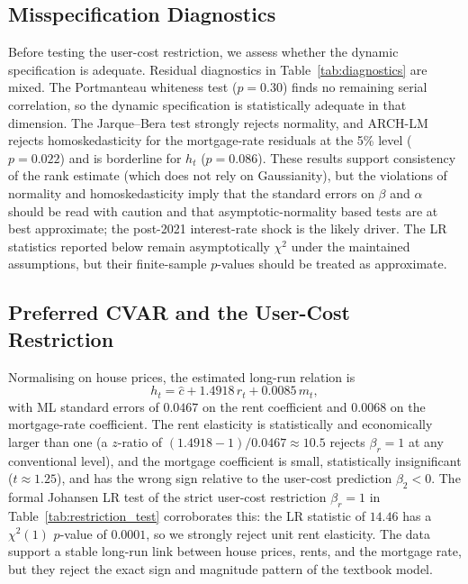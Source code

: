 \documentclass[12pt]{article}
\begin{document}
\subsection{Misspecification Diagnostics}

Before testing the user-cost restriction, we assess whether the dynamic specification is adequate. Residual diagnostics in Table~\ref{tab:diagnostics} are mixed. The Portmanteau whiteness test ($p=0.30$) finds no remaining serial correlation, so the dynamic specification is statistically adequate in that dimension. The Jarque--Bera test strongly rejects normality, and ARCH-LM rejects homoskedasticity for the mortgage-rate residuals at the 5\% level ($p=0.022$) and is borderline for $h_t$ ($p=0.086$). These results support consistency of the rank estimate (which does not rely on Gaussianity), but the violations of normality and homoskedasticity imply that the standard errors on $\beta$ and $\alpha$ should be read with caution and that asymptotic-normality based tests are at best approximate; the post-2021 interest-rate shock is the likely driver. The LR statistics reported below remain asymptotically $\chi^2$ under the maintained assumptions, but their finite-sample $p$-values should be treated as approximate.



\subsection{Preferred CVAR and the User-Cost Restriction}

Normalising on house prices, the estimated long-run relation is
\begin{equation}
	h_t = \hat c + 1.4918\,r_t + 0.0085\,m_t,
\end{equation}
with ML standard errors of $0.0467$ on the rent coefficient and $0.0068$ on the mortgage-rate coefficient. The rent elasticity is statistically and economically larger than one (a $z$-ratio of $(1.4918-1)/0.0467 \approx 10.5$ rejects $\beta_r=1$ at any conventional level), and the mortgage coefficient is small, statistically insignificant ($t\approx 1.25$), and has the wrong sign relative to the user-cost prediction $\beta_2<0$. The formal Johansen LR test of the strict user-cost restriction $\beta_r=1$ in Table~\ref{tab:restriction_test} corroborates this: the LR statistic of $14.46$ has a $\chi^2(1)$ $p$-value of $0.0001$, so we strongly reject unit rent elasticity. The data support a stable long-run link between house prices, rents, and the mortgage rate, but they reject the exact sign and magnitude pattern of the textbook model.
\end{document}
